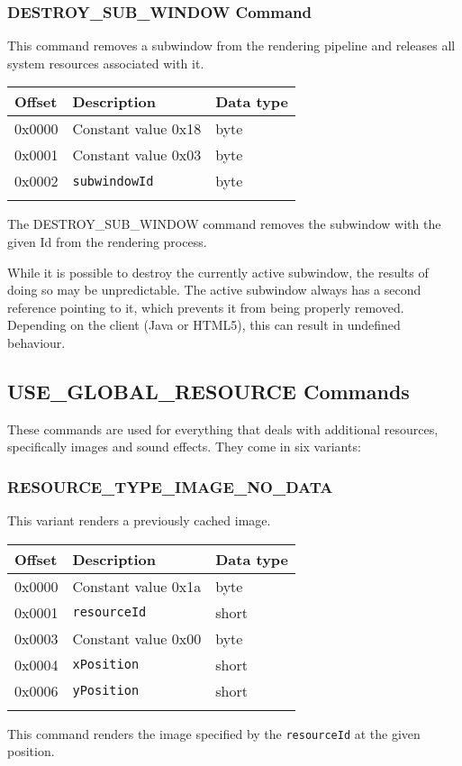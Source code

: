 \documentclass{article}
\newcommand{\field}[1]{\textcolor{fieldColor}{\texttt{#1}}}
\newenvironment{bytelisting}
{\ttfamily \begin{center} \begin{tabular}{l l l} Offset & Description & Data type \\ \hline}
{\normalfont \end{tabular} \end{center}}
\begin{document}
\subsubsection{DESTROY\_SUB\_WINDOW Command}
This command removes a subwindow from the rendering pipeline and releases all system resources associated with it.

\begin{bytelisting}
0x0000 & Constant value 0x18 & byte \\
0x0001 & Constant value 0x03 & byte \\
0x0002 & \field{subwindowId} & byte \\
\end{bytelisting}

The DESTROY\_SUB\_WINDOW command removes the subwindow with the given Id from the rendering process.

While it is possible to destroy the currently active subwindow, the results of doing so may be unpredictable. The active subwindow always has a second reference pointing to it, which prevents it from being
properly removed. Depending on the client (Java or HTML5), this can result in undefined behaviour.

\subsection{USE\_GLOBAL\_RESOURCE Commands}
These commands are used for everything that deals with additional resources, specifically images and sound effects. They come in six variants:

\subsubsection{RESOURCE\_TYPE\_IMAGE\_NO\_DATA}
This variant renders a previously cached image.

\begin{bytelisting}
0x0000 & Constant value 0x1a & byte \\
0x0001 & \field{resourceId} & short \\
0x0003 & Constant value 0x00 & byte \\
0x0004 & \field{xPosition} & short \\
0x0006 & \field{yPosition} & short \\
\end{bytelisting}

This command renders the image specified by the \field{resourceId} at the given position.
\end{document}
